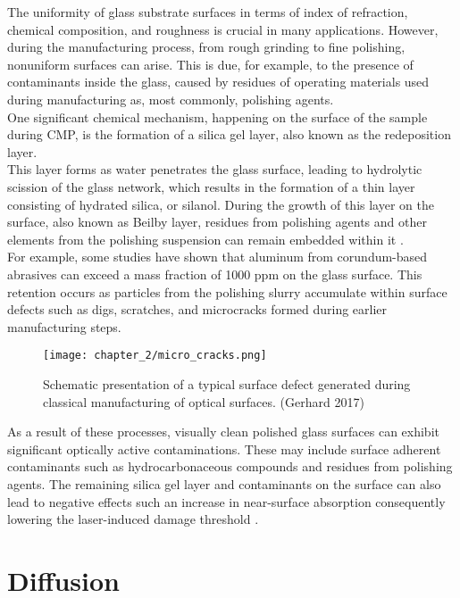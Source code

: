 The uniformity of glass substrate surfaces in terms of index of refraction, chemical composition, and roughness is crucial in many applications. However, during the manufacturing process, from rough grinding to fine polishing, nonuniform surfaces can arise. This is due, for example, to the presence of contaminants inside the glass, caused by residues of operating materials used during manufacturing as, most commonly, polishing agents.
\\
One significant chemical mechanism, happening on the surface of the sample during CMP, is the formation of a silica gel layer, also known as the redeposition layer.
\\
This layer forms as water penetrates the glass surface, leading to hydrolytic scission of the glass network, which results in the formation of a thin layer consisting of hydrated silica, or silanol. During the growth of this layer on the surface, also known as Beilby layer, residues from polishing agents and other elements from the polishing suspension can remain embedded within it \cite{suratwalaChemistryFormationBeilby2015}.
\\
For example, some studies \cite{kozlowskiDepthProfilingPolishinginduced1998} have shown that aluminum from corundum-based abrasives can exceed a mass fraction of 1000 ppm on the glass surface. This retention occurs as particles from the polishing slurry accumulate within surface defects such as digs, scratches, and microcracks formed during earlier manufacturing steps.

\begin{figure}[H]
    \centering
    \texttt{[image: chapter\_2/micro\_cracks.png]}
    \caption[Schematic of a surface defect generated during optics manufacturing.]{ Schematic presentation of a typical surface defect generated
during classical manufacturing of optical surfaces. (Gerhard 2017)}
    \label{fig:micro_cracks}
\end{figure}
As a result of these processes, visually clean polished glass surfaces can exhibit significant optically active contaminations. These may include surface adherent contaminants such as hydrocarbonaceous compounds and residues from polishing agents. The remaining silica gel layer and contaminants on the surface can also lead to negative effects such an increase in near-surface absorption consequently lowering the laser-induced damage threshold \cite{neauportPolishinginducedContaminationFused2005}.

\section{Diffusion}
\label{subsec:diff}

